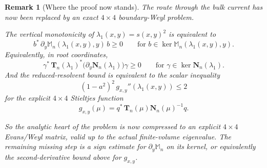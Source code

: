 \documentclass[11pt]{article}
\newtheorem{remark}[theorem]{Remark}
\begin{document}
\begin{remark}[Where the proof now stands]
The route through the bulk current has now been replaced by an exact \(4\times4\) boundary-Weyl problem.

\smallskip

\noindent
The vertical monotonicity of \(\lambda_1(x,y)=s(x,y)^2\) is equivalent to
\[
b^*\,\partial_y\mathbb M_n(\lambda_1(x,y),y)\,b\ge 0
\qquad
\text{for }b\in\ker \mathbb M_n(\lambda_1(x,y),y).
\]
Equivalently, in root coordinates,
\[
\gamma^*\,\mathbf T_n(\lambda_1)^*
\bigl(\partial_y\mathbf N_n(\lambda_1)\bigr)\gamma\ge 0
\qquad
\text{for }\gamma\in\ker \mathbf N_n(\lambda_1).
\]
And the reduced-resolvent bound is equivalent to the scalar inequality
\[
(1-a^2)^2\,g_{x,y}''(\lambda_1(x,y))\le 2
\]
for the explicit \(4\times4\) Stieltjes function
\[
g_{x,y}(\mu)=q^*\,\mathbf T_n(\mu)\mathbf N_n(\mu)^{-1}q.
\]

\smallskip

\noindent
So the analytic heart of the problem is now compressed to an explicit \(4\times4\) Evans/Weyl matrix,
valid up to the actual finite-volume eigenvalue. The remaining missing step is a sign estimate for
\(\partial_y\mathbb M_n\) on its kernel, or equivalently the second-derivative bound above for
\(g_{x,y}\).
\end{remark}
\end{document}
